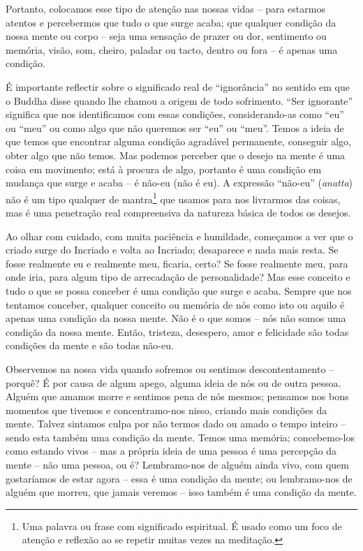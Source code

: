 Portanto, colocamos esse tipo de atenção nas nossas vidas -- para estarmos
atentos e percebermos que tudo o que surge acaba; que qualquer condição da nossa
mente ou corpo -- seja uma sensação de prazer ou dor, sentimento ou memória,
visão, som, cheiro, paladar ou tacto, dentro ou fora -- é apenas uma condição.

É importante reflectir sobre o significado real de ``ignorância'' no sentido em
que o Buddha disse quando lhe chamou a origem de todo sofrimento. ``Ser
ignorante'' significa que nos identificamos com essas condições, considerando-as
como ``eu'' ou ``meu'' ou como algo que não queremos ser ``eu'' ou ``meu''.
Temos a ideia de que temos que encontrar alguma condição agradável permanente,
conseguir algo, obter algo que não temos. Mas podemos perceber que o desejo na
mente é uma coisa em movimento; está à procura de algo, portanto é uma condição
em mudança que surge e acaba -- é não-eu (não é eu). A expressão ``não-eu''
(\emph{anatta}) não é um tipo qualquer de mantra\footnote{Uma palavra ou frase
  com significado espiritual. É usado como um foco de atenção e reflexão ao se
  repetir muitas vezes na meditação.} que usamos para nos livrarmos das coisas,
mas é uma penetração real compreensiva da natureza básica de todos os desejos.

Ao olhar com cuidado, com muita paciência e humildade, começamos a ver que o
criado surge do Incriado e volta ao Incriado; desaparece e nada mais resta. Se
fosse realmente eu e realmente meu, ficaria, certo? Se fosse realmente meu, para
onde iria, para algum tipo de arrecadação de personalidade? Mas esse conceito e
tudo o que se possa conceber é uma condição que surge e acaba. Sempre que nos
tentamos conceber, qualquer conceito ou memória de nós como isto ou aquilo é
apenas uma condição da nossa mente. Não é o que somos -- nós não somos uma
condição da nossa mente. Então, tristeza, desespero, amor e felicidade são todas
condições da mente e são todas não-eu.

Observemos na nossa vida quando sofremos ou sentimos descontentamento -- porquê?
É por causa de algum apego, alguma ideia de nós ou de outra pessoa. Alguém que
amamos morre e sentimos pena de nós mesmos; pensamos nos bons momentos que
tivemos e concentramo-nos nisso, criando mais condições da mente. Talvez
sintamos culpa por não termos dado ou amado o tempo inteiro -- sendo esta também
uma condição da mente. Temos uma memória; concebemo-los como estando vivos --
mas a própria ideia de uma pessoa é uma percepção da mente -- não uma pessoa, ou
é? Lembramo-nos de alguém ainda vivo, com quem gostaríamos de estar agora -- essa
é uma condição da mente; ou lembramo-nos de alguém que morreu, que jamais
veremos -- isso também é uma condição da mente.

